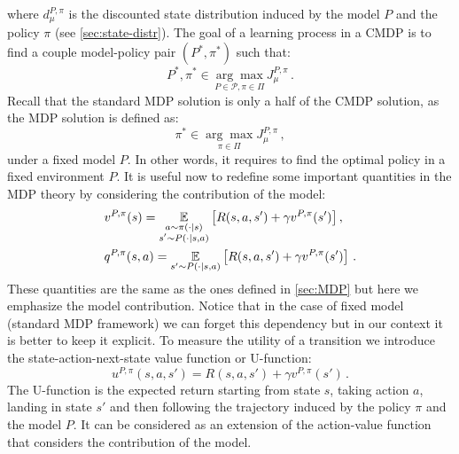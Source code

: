 where $d_{\mu}^{P, \pi}$ is the discounted state distribution induced by the model $P$ and the policy $\pi$ (see \cref{sec:state-distr}).
The goal of a learning process in a CMDP is to find a couple model-policy pair $(P^*, \pi^*)$ such that:
\begin{equation}
	P^*, \pi^* \in \underset{P \in \mathcal{P}, \pi \in \Pi}{\arg \max} J_{\mu}^{P, \pi}   \, .
\end{equation}
Recall that the standard MDP solution is only a half of the CMDP solution, as the MDP solution is defined as:
\begin{equation}
	\pi^* \in \underset{\pi \in \Pi}{\arg \max} J_{\mu}^{P, \pi}   \, ,
\end{equation}
under a fixed model $P$.
In other words, it requires to find the optimal policy in a fixed environment $P$. \newline
It is useful now to redefine some important quantities in the MDP theory by considering the contribution of the model:
\begin{align}
	& v^{P,\pi}(s) = \underset{
	\begin{subarray}{c}
		a \sim \pi(\cdot | s) \\
		s' \sim P(\cdot | s,a)
	\end{subarray}}{\mathbb{E}} \left[ R(s,a,s') + \gamma v^{P,\pi}(s') \right], \\
	& q^{P,\pi} (s,a) = \underset{s' \sim P(\cdot | s,a)}{\mathbb{E}} \left[ R(s,a,s') + \gamma v^{P,\pi}(s') \right] \, .
\end{align}
These quantities are the same as the ones defined in \cref{sec:MDP} but here we emphasize the model contribution. Notice that in the case of fixed model (standard MDP framework) we can forget this dependency but in our context it is better to keep it explicit. \newline
To measure the utility of a transition we introduce the state-action-next-state value function or U-function:
\begin{equation}
	u^{P,\pi}(s,a,s') = R(s,a,s') + \gamma v^{P,\pi}(s') \, .
\end{equation}
The U-function is the expected return starting from state $s$, taking action $a$, landing in state $s'$ and then following the trajectory induced by the policy $\pi$ and the model $P$. It can be considered as an extension of the action-value function that considers the contribution of the model.
